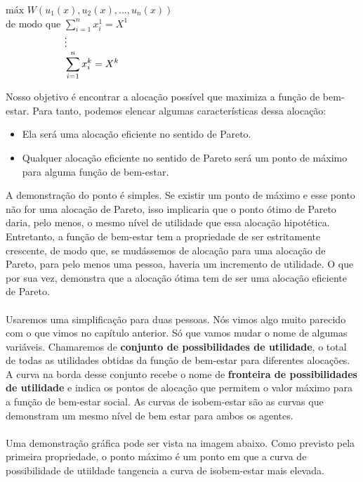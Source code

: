 \documentclass[a4paper,11pt,oneside]{book}
\theoremstyle{definition}
\theoremstyle{break}
\begin{document}
\begin{center}
	$\textrm{máx } W(u_1(x),u_2(x),...,u_n(x))$ \\
	$\textrm{de modo que } \displaystyle \sum^n_{i = 1} x^1_i = X^1$ \\
	$\textrm{\hphantom{de modo que }} \vdots$ \\
	$\textrm{\hphantom{de modo que }}\displaystyle \sum^n_{i = 1} x^k_i = X^k$
\end{center}

Nosso objetivo é encontrar a alocação possível que maximiza a função de bem-estar. Para tanto, podemos elencar algumas características dessa alocação:
\begin{itemize}
	\item Ela será uma alocação eficiente no sentido de Pareto.
	\item Qualquer alocação eficiente no sentido de Pareto será um ponto de máximo para alguma função de bem-estar.
\end{itemize}

A demonstração do ponto é simples. Se existir um ponto de máximo e esse ponto não for uma alocação de Pareto, isso implicaria que o ponto ótimo de Pareto daria, pelo menos, o mesmo nível de utilidade que essa alocação hipotética. Entretanto, a função de bem-estar tem a propriedade de ser estritamente crescente, de modo que, se mudássemos de alocação para uma alocação de Pareto, para pelo menos uma pessoa, haveria um incremento de utilidade. O que por sua vez, demonstra que a alocação ótima tem de ser uma alocação eficiente de Pareto.
\\~\\
Usaremos uma simplificação para duas pessoas. Nós vimos algo muito parecido com o que vimos no capítulo anterior. Só que vamos mudar o nome de algumas variáveis. Chamaremos de \textbf{conjunto de possibilidades de utilidade}, o total de todas as utilidades obtidas da função de bem-estar para diferentes alocações. A curva na borda desse conjunto recebe o nome de \textbf{fronteira de possibilidades de utilidade} e indica os pontos de alocação que permitem o valor máximo para a função de bem-estar social. As curvas de isobem-estar são as curvas que demonstram um mesmo nível de bem estar para ambos os agentes.
\\~\\
Uma demonstração gráfica pode ser vista na imagem abaixo. Como previsto pela primeira propriedade, o ponto máximo é um ponto em que a curva de possibilidade de utiildade tangencia a curva de isobem-estar mais elevada.
\end{document}
